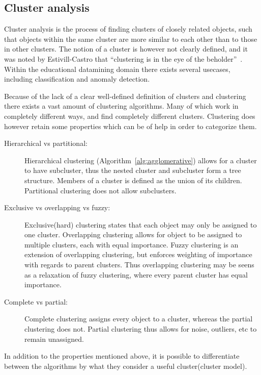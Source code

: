 \subsection{Cluster analysis}
Cluster analysis is the process of finding clusters of closely related objects, such that objects within the same cluster are more similar to each other than to those in other clusters. 
The notion of a cluster is however not clearly defined, and it was noted by Estivill-Castro that "`clustering is in the eye of the beholder"'~\cite{estivill2002so}.
Within the educational datamining domain there exists several usecases, including classification and anomaly detection.

\bigskip\noindent
Because of the lack of a clear well-defined definition of clusters and clustering there exists a vast amount of clustering algorithms. 
Many of which work in completely different ways, and find completely different clusters. 
Clustering does however retain some properties which can be of help in order to categorize them. 

\begin{description}
	\item[Hierarchical vs partitional:] Hierarchical clustering (Algorithm~\ref{alg:agglomerative}) allows for a cluster to have subcluster, thus the nested cluster and subcluster form a tree structure. Members of a cluster is defined as the union of its children. Partitional clustering does not allow subclusters. 
	\item[Exclusive vs overlapping vs fuzzy:] Exclusive(hard) clustering states that each object may only be assigned to one cluster. Overlapping clustering allows for object to be assigned to multiple clusters, each with equal importance. Fuzzy clustering is an extension of overlapping clustering, but enforces weighting of importance with regards to parent clusters. Thus overlapping clustering may be seens as a relaxation of fuzzy clustering, where every parent cluster has equal importance.
	\item[Complete vs partial:] Complete clustering assigns every object to a cluster, whereas the partial clustering does not. Partial clustering thus allows for noise, outliers, etc to remain unassigned.
\end{description}

\bigskip\noindent
In addition to the properties mentioned above, it is possible to 
differentiate between the algorithms by what they consider a useful cluster(cluster model). 

